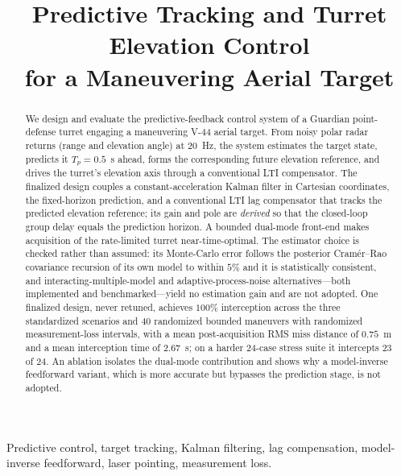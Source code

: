 \documentclass[conference]{IEEEtran}
\begin{document}
\title{Predictive Tracking and Turret Elevation Control\\ for a Maneuvering Aerial Target}

\author{
}

\maketitle

\begin{abstract}
We design and evaluate the predictive-feedback control system of a Guardian point-defense turret engaging a maneuvering V-44 aerial target. From noisy polar radar returns (range and elevation angle) at 20~Hz, the system estimates the target state, predicts it $T_p=0.5$~s ahead, forms the corresponding future elevation reference, and drives the turret's elevation axis through a conventional LTI compensator. The finalized design couples a constant-acceleration Kalman filter in Cartesian coordinates, the fixed-horizon prediction, and a conventional LTI lag compensator that tracks the predicted elevation reference; its gain and pole are \emph{derived} so that the closed-loop group delay equals the prediction horizon. A bounded dual-mode front-end makes acquisition of the rate-limited turret near-time-optimal. The estimator choice is checked rather than assumed: its Monte-Carlo error follows the posterior Cram\'er--Rao covariance recursion of its own model to within $5\%$ and it is statistically consistent, and interacting-multiple-model and adaptive-process-noise alternatives---both implemented and benchmarked---yield no estimation gain and are not adopted. One finalized design, never retuned, achieves $100\%$ interception across the three standardized scenarios and 40 randomized bounded maneuvers with randomized measurement-loss intervals, with a mean post-acquisition RMS miss distance of $0.75$~m and a mean interception time of $2.67$~s; on a harder 24-case stress suite it intercepts $23$ of $24$. An ablation isolates the dual-mode contribution and shows why a model-inverse feedforward variant, which is more accurate but bypasses the prediction stage, is not adopted.
\end{abstract}

\begin{IEEEkeywords}
Predictive control, target tracking, Kalman filtering, lag compensation, model-inverse feedforward, laser pointing, measurement loss.
\end{IEEEkeywords}
\end{document}
